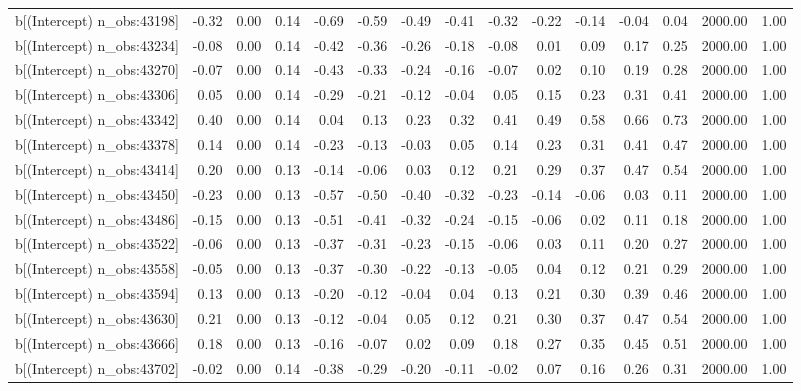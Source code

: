 \begin{table}[ht]
\begin{tabular}{rrrrrrrrrrrrrrr}
  b[(Intercept) n\_obs:43198] & -0.32 & 0.00 & 0.14 & -0.69 & -0.59 & -0.49 & -0.41 & -0.32 & -0.22 & -0.14 & -0.04 & 0.04 & 2000.00 & 1.00 \\ 
  b[(Intercept) n\_obs:43234] & -0.08 & 0.00 & 0.14 & -0.42 & -0.36 & -0.26 & -0.18 & -0.08 & 0.01 & 0.09 & 0.17 & 0.25 & 2000.00 & 1.00 \\ 
  b[(Intercept) n\_obs:43270] & -0.07 & 0.00 & 0.14 & -0.43 & -0.33 & -0.24 & -0.16 & -0.07 & 0.02 & 0.10 & 0.19 & 0.28 & 2000.00 & 1.00 \\ 
  b[(Intercept) n\_obs:43306] & 0.05 & 0.00 & 0.14 & -0.29 & -0.21 & -0.12 & -0.04 & 0.05 & 0.15 & 0.23 & 0.31 & 0.41 & 2000.00 & 1.00 \\ 
  b[(Intercept) n\_obs:43342] & 0.40 & 0.00 & 0.14 & 0.04 & 0.13 & 0.23 & 0.32 & 0.41 & 0.49 & 0.58 & 0.66 & 0.73 & 2000.00 & 1.00 \\ 
  b[(Intercept) n\_obs:43378] & 0.14 & 0.00 & 0.14 & -0.23 & -0.13 & -0.03 & 0.05 & 0.14 & 0.23 & 0.31 & 0.41 & 0.47 & 2000.00 & 1.00 \\ 
  b[(Intercept) n\_obs:43414] & 0.20 & 0.00 & 0.13 & -0.14 & -0.06 & 0.03 & 0.12 & 0.21 & 0.29 & 0.37 & 0.47 & 0.54 & 2000.00 & 1.00 \\ 
  b[(Intercept) n\_obs:43450] & -0.23 & 0.00 & 0.13 & -0.57 & -0.50 & -0.40 & -0.32 & -0.23 & -0.14 & -0.06 & 0.03 & 0.11 & 2000.00 & 1.00 \\ 
  b[(Intercept) n\_obs:43486] & -0.15 & 0.00 & 0.13 & -0.51 & -0.41 & -0.32 & -0.24 & -0.15 & -0.06 & 0.02 & 0.11 & 0.18 & 2000.00 & 1.00 \\ 
  b[(Intercept) n\_obs:43522] & -0.06 & 0.00 & 0.13 & -0.37 & -0.31 & -0.23 & -0.15 & -0.06 & 0.03 & 0.11 & 0.20 & 0.27 & 2000.00 & 1.00 \\ 
  b[(Intercept) n\_obs:43558] & -0.05 & 0.00 & 0.13 & -0.37 & -0.30 & -0.22 & -0.13 & -0.05 & 0.04 & 0.12 & 0.21 & 0.29 & 2000.00 & 1.00 \\ 
  b[(Intercept) n\_obs:43594] & 0.13 & 0.00 & 0.13 & -0.20 & -0.12 & -0.04 & 0.04 & 0.13 & 0.21 & 0.30 & 0.39 & 0.46 & 2000.00 & 1.00 \\ 
  b[(Intercept) n\_obs:43630] & 0.21 & 0.00 & 0.13 & -0.12 & -0.04 & 0.05 & 0.12 & 0.21 & 0.30 & 0.37 & 0.47 & 0.54 & 2000.00 & 1.00 \\ 
  b[(Intercept) n\_obs:43666] & 0.18 & 0.00 & 0.13 & -0.16 & -0.07 & 0.02 & 0.09 & 0.18 & 0.27 & 0.35 & 0.45 & 0.51 & 2000.00 & 1.00 \\ 
  b[(Intercept) n\_obs:43702] & -0.02 & 0.00 & 0.14 & -0.38 & -0.29 & -0.20 & -0.11 & -0.02 & 0.07 & 0.16 & 0.26 & 0.31 & 2000.00 & 1.00 \\ 

\end{tabular}
\end{table}
